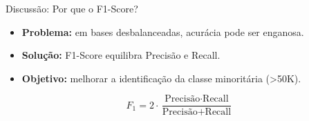 \begin{slide}{Discussão: Por que o F1-Score?}
  \begin{itemize}
    \item \textbf{Problema:} em bases desbalanceadas, acurácia pode ser enganosa.
    \item \textbf{Solução:} F1-Score equilibra Precisão e Recall.
    \item \textbf{Objetivo:} melhorar a identificação da classe minoritária (\textgreater 50K).
  \end{itemize}

  \[
    F_1 = 2 \cdot \frac{\text{Precisão} \cdot \text{Recall}}{\text{Precisão} + \text{Recall}}
  \]
\end{slide}
